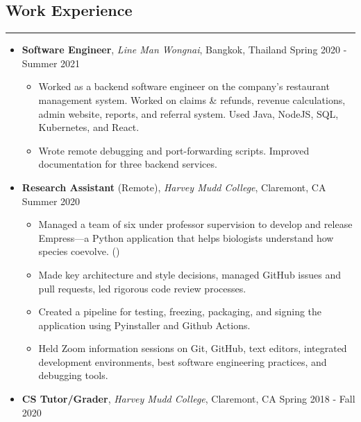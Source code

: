 \documentclass[10pt,letterpaper]{article}
\begin{document}
\subsection*{Work Experience}
\vspace{-0.5em}
\hrule
\vspace{1em}
  \begin{itemize}[label={},leftmargin=*]
    \setlength\itemsep{1em}
    \parskip=-0.2em
    \item
    {\textbf{Software Engineer}, \textit{Line Man Wongnai}, Bangkok, Thailand \hfill {Spring 2020 - Summer 2021}}
    \begin{itemize}[label=\textbullet]
      \itemsep0em
      \item Worked as a backend software engineer on the company's restaurant management system. Worked on claims \& refunds, revenue calculations, admin website, reports, and referral system. Used Java, NodeJS, SQL, Kubernetes, and React.
      \item Wrote remote debugging and port-forwarding scripts. Improved documentation for three backend services.
    \end{itemize}
    \item
    {\textbf{Research Assistant} (Remote), \textit{Harvey Mudd College}, Claremont, CA \hfill {Summer 2020}}
    \begin{itemize}[label=\textbullet]
      \itemsep0em
      \item Managed a team of six under professor supervision to develop and release Empress---a Python application that helps biologists understand how species coevolve. (\href{https://github.com/ssantichaivekin/empress}
      {})
      \item Made key architecture and style decisions, managed GitHub issues and pull requests, led rigorous code review processes.
      \item Created a pipeline for testing, freezing, packaging, and signing the application using Pyinstaller and Github Actions.
      \item Held Zoom information sessions on Git, GitHub, text editors, integrated development environments, best software engineering practices, and debugging tools.
    \end{itemize}
    \item
    {\textbf{CS Tutor/Grader}, \textit{Harvey Mudd College}, Claremont, CA \hfill {Spring 2018 - Fall 2020}}
    \begin{itemize}[label=\textbullet]

\end{itemize}
\end{itemize}
\end{document}
